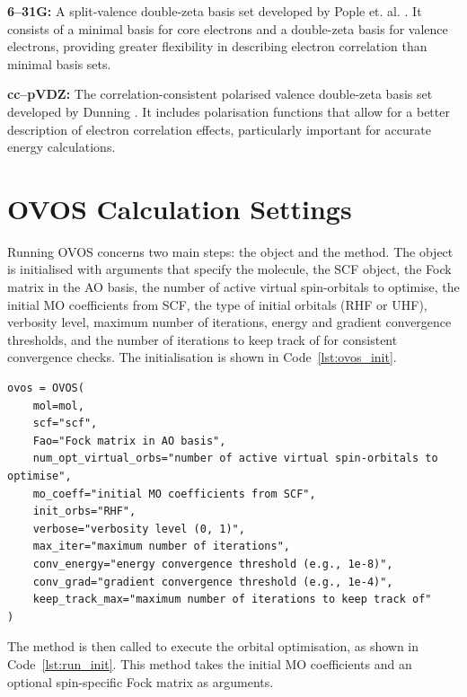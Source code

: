 \textbf{6--31G:} A split-valence double-zeta basis set developed by Pople et. al. \cite{ditchfield1971a, dill1975a, hehre1972a}. It consists of a minimal basis for core electrons and a double-zeta basis for valence electrons, providing greater flexibility in describing electron correlation than minimal basis sets.

\textbf{cc--pVDZ:} The correlation-consistent polarised valence double-zeta basis set developed by Dunning \cite{dunning1989}. It includes polarisation functions that allow for a better description of electron correlation effects, particularly important for accurate energy calculations.

\section{OVOS Calculation Settings}
\label{sec:comp_calc_set_ovos}

Running OVOS concerns two main steps: the  object and the  method. The  object is initialised with arguments that specify the molecule, the SCF object, the Fock matrix in the AO basis, the number of active virtual spin-orbitals to optimise, the initial MO coefficients from SCF, the type of initial orbitals (RHF or UHF), verbosity level, maximum number of iterations, energy and gradient convergence thresholds, and the number of iterations to keep track of for consistent convergence checks. The initialisation is shown in Code~\ref{lst:ovos_init}.

\newpage

\begin{lstlisting}[style=python, caption={OVOS Object}, label=lst:ovos_init]
ovos = OVOS(
    mol=mol,
    scf="scf",          
    Fao="Fock matrix in AO basis", 
    num_opt_virtual_orbs="number of active virtual spin-orbitals to optimise",  
    mo_coeff="initial MO coefficients from SCF",   
    init_orbs="RHF",         
    verbose="verbosity level (0, 1)",
    max_iter="maximum number of iterations",
    conv_energy="energy convergence threshold (e.g., 1e-8)",
    conv_grad="gradient convergence threshold (e.g., 1e-4)",
    keep_track_max="maximum number of iterations to keep track of"
)
\end{lstlisting}

The  method is then called to execute the orbital optimisation, as shown in Code~\ref{lst:run_init}. This method takes the initial MO coefficients and an optional spin-specific Fock matrix as arguments.

